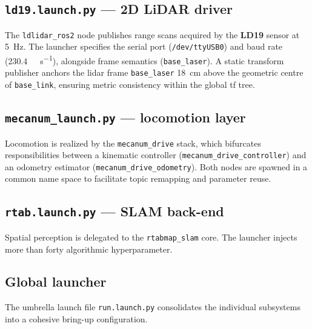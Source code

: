 \subsection*{\texttt{ld19.launch.py} --- 2D LiDAR driver}
The \texttt{ldlidar\_ros2} node publishes range scans acquired by the \textbf{LD19} sensor at \SI{5}{\hertz}. The launcher specifies the serial port (\texttt{/dev/ttyUSB0}) and baud rate (\SI{230.4}{\kilo\bit\per\second}), alongside frame semantics (\texttt{base\_laser}). A static transform publisher anchors the \gls{lidar} frame \texttt{base\_laser} \SI{18}{\centi\metre} above the geometric centre of \texttt{base\_link}, ensuring metric consistency within the global \gls{tf} tree.

\subsection*{\texttt{mecanum\_launch.py} --- locomotion layer}
Locomotion is realized by the \texttt{mecanum\_drive} stack, which bifurcates responsibilities between a kinematic controller (\texttt{mecanum\_drive\_controller}) and an odometry estimator (\texttt{mecanum\_drive\_odometry}). Both nodes are spawned in a common name space to facilitate topic remapping and parameter reuse.

\subsection*{\texttt{rtab.launch.py} --- SLAM back-end}
Spatial perception is delegated to the \texttt{rtabmap\_slam} core. The launcher injects more than forty algorithmic hyperparameter.

\subsection*{Global launcher}
The umbrella launch file \texttt{run.launch.py} consolidates the individual subsystems into a cohesive bring-up configuration.

